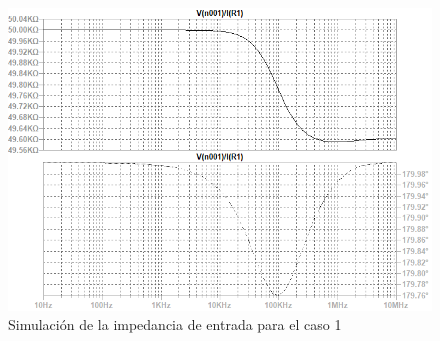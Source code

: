 \begin{figure}[H]
\begin{centering}
\includegraphics[scale=0.5]{../Ex1/ib/Resources1b/zinp1_sim}
\par\end{centering}
\caption{Simulación de la impedancia de entrada para el caso 1}

\end{figure}

